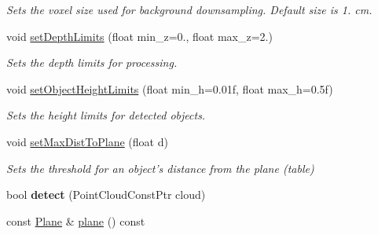 \begin{DoxyCompactItemize}
\begin{DoxyCompactList}\small\item\em Sets the voxel size used for background downsampling. Default size is 1. cm. \end{DoxyCompactList}\item 
\hypertarget{classope_1_1_table_object_detector_ab141a973c1ef4057ce3294b5f14868fc}{void \hyperlink{classope_1_1_table_object_detector_ab141a973c1ef4057ce3294b5f14868fc}{set\-Depth\-Limits} (float min\-\_\-z=0., float max\-\_\-z=2.)}\label{classope_1_1_table_object_detector_ab141a973c1ef4057ce3294b5f14868fc}

\begin{DoxyCompactList}\small\item\em Sets the depth limits for processing. \end{DoxyCompactList}\item 
\hypertarget{classope_1_1_table_object_detector_ada4261fed1a6ec12829757e81f1cfd51}{void \hyperlink{classope_1_1_table_object_detector_ada4261fed1a6ec12829757e81f1cfd51}{set\-Object\-Height\-Limits} (float min\-\_\-h=0.\-01f, float max\-\_\-h=0.\-5f)}\label{classope_1_1_table_object_detector_ada4261fed1a6ec12829757e81f1cfd51}

\begin{DoxyCompactList}\small\item\em Sets the height limits for detected objects. \end{DoxyCompactList}\item 
\hypertarget{classope_1_1_table_object_detector_ae2cebb051690bf558e0f6de7fdba3873}{void \hyperlink{classope_1_1_table_object_detector_ae2cebb051690bf558e0f6de7fdba3873}{set\-Max\-Dist\-To\-Plane} (float d)}\label{classope_1_1_table_object_detector_ae2cebb051690bf558e0f6de7fdba3873}

\begin{DoxyCompactList}\small\item\em Sets the threshold for an object's distance from the plane (table) \end{DoxyCompactList}\item 
\hypertarget{classope_1_1_table_object_detector_a5c86608c4b555cb23e28804bf06f2e2b}{bool {\bfseries detect} (Point\-Cloud\-Const\-Ptr cloud)}\label{classope_1_1_table_object_detector_a5c86608c4b555cb23e28804bf06f2e2b}

\item 
\hypertarget{classope_1_1_table_object_detector_ad1b0adb48ce66a4c79b8bd0be8a25fb5}{const \hyperlink{classope_1_1_plane}{Plane} \& \hyperlink{classope_1_1_table_object_detector_ad1b0adb48ce66a4c79b8bd0be8a25fb5}{plane} () const }\label{classope_1_1_table_object_detector_ad1b0adb48ce66a4c79b8bd0be8a25fb5}


\end{DoxyCompactItemize}
